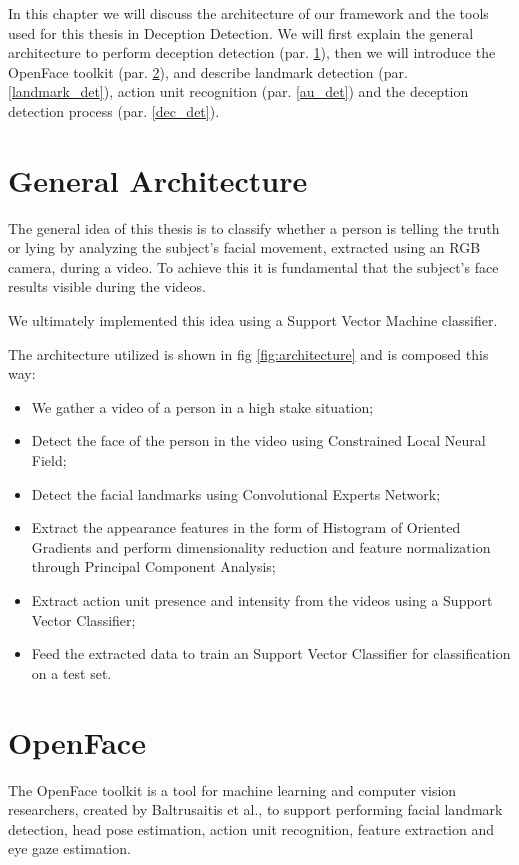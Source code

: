 In this chapter we will discuss the architecture of our framework and the tools used for this thesis in Deception Detection. We will first explain the general architecture to perform deception detection (par. \ref{ga}), then we will introduce the OpenFace toolkit (par. \ref{OpenFace}), and describe landmark detection (par. \ref{landmark_det}), action unit recognition (par. \ref{au_det}) and the deception detection process (par. \ref{dec_det}).

\section{General Architecture} \label{ga}
The general idea of this thesis is to classify whether a person is telling the truth or lying by analyzing the subject's facial movement, extracted using an RGB camera, during a video. To achieve this it is fundamental that the subject's face results visible during the videos.

We ultimately implemented this idea using a Support Vector Machine classifier. 

The architecture utilized is shown in fig \ref{fig:architecture} and is composed this way:

\begin{itemize}
	\item We gather a video of a person in a high stake situation;
	\item Detect the face of the person in the video using Constrained Local Neural Field;
	\item Detect the facial landmarks using Convolutional Experts Network;
	\item Extract the appearance features in the form of Histogram of Oriented Gradients and perform dimensionality reduction and feature normalization through Principal Component Analysis;
	\item Extract action unit presence and intensity from the videos using a Support Vector Classifier;
	\item Feed the extracted data to train an Support Vector Classifier for classification on a test set.
\end{itemize}

\clearpage

\section{OpenFace} \label{OpenFace}
The OpenFace \cite{Baltru2018} toolkit is a tool for machine learning and computer vision researchers, created by Baltrusaitis et al., to support performing facial landmark detection, head pose estimation, action unit recognition, feature extraction and eye gaze estimation. 

